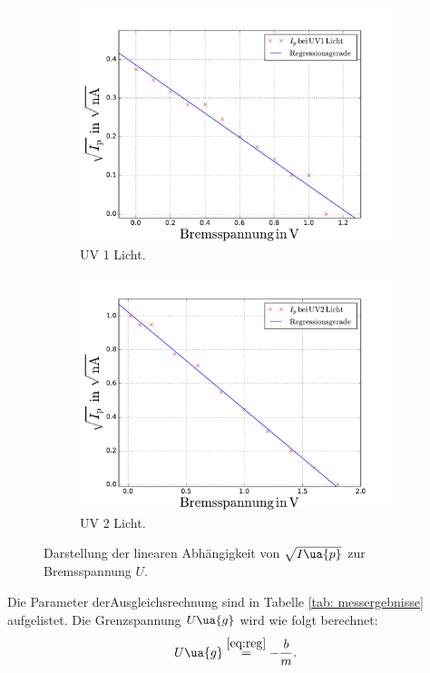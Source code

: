 \begin{figure}
  \centering
  \begin{subfigure}{0.48\textwidth}
    \centering
    \includegraphics[width=1 \textwidth]{../Messdaten/uv_eins.pdf}
    \caption{UV 1 Licht.}
    \label{fig: uv_eins}
  \end{subfigure}
  \begin{subfigure}{0.48\textwidth}
    \centering
    \includegraphics[width=1 \textwidth]{../Messdaten/uv_zwei.pdf}
    \caption{UV 2 Licht.}
    \label{fig: uv_zwei}
  \end{subfigure}
  \caption{Darstellung der linearen Abhängigkeit von $\sqrt{I\ua{p}}$ zur Bremsspannung $U$.}
  \label{fig: darstellung_3}
\end{figure}
Die Parameter derAusgleichsrechnung sind in Tabelle %
\ref{tab: messergebnisse} aufgelistet. Die Grenzspannung $U\ua{g}$ wird
wie folgt berechnet:
\begin{equation}
  \label{eq:ug}
  U\ua{g}\overset{\ref{eq:reg}}{=}-\frac{b}{m}.
\end{equation}


